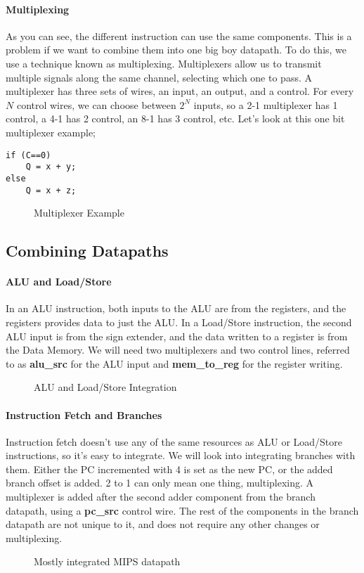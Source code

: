 \paragraph{Multiplexing}
As you can see, the different instruction can use the same components. This is a problem if we want to combine them into one big boy datapath. To do this, we use a technique known as multiplexing. Multiplexers allow us to transmit multiple signals along the same channel, selecting which one to pass. A multiplexer has three sets of wires, an input, an output, and a control. For every $N$ control wires, we can choose between $2^N$ inputs, so a 2-1 multiplexer has 1 control, a 4-1 has 2 control, an 8-1 has 3 control, etc. Let's look at this one bit multiplexer example;
\begin{verbatim}
if (C==0)
    Q = x + y;
else
    Q = x + z;
\end{verbatim}

 \begin{figure}[!htb]
 	\caption{\label{fig:multiplex} Multiplexer Example}
 \end{figure}
\subsection{Combining Datapaths}
\paragraph{ALU and Load/Store}
In an ALU instruction, both inputs to the ALU are from the registers, and the registers provides data to just the ALU. In a Load/Store instruction, the second ALU input is from the sign extender, and the data written to a register is from the Data Memory. We will need two multiplexers and two control lines, referred to as \textbf{alu\_src} for the ALU input and \textbf{mem\_to\_reg} for the register writing.
\begin{figure}[!htb]
	\caption{\label{fig:aluls} ALU and Load/Store Integration}
\end{figure}
\paragraph{Instruction Fetch  and Branches}
Instruction fetch doesn't use any of the same resources as ALU or Load/Store instructions, so it's easy to integrate. We will look into integrating branches with them. Either the PC incremented with 4 is set as the new PC, or the added branch offset is added. 2 to 1 can only mean one thing, multiplexing. A multiplexer is added after the second adder component from the branch datapath, using a \textbf{pc\_src} control wire. The rest of the components in the branch datapath are not unique to it, and does not require any other changes or multiplexing.
 \begin{figure}[!htb]
	\caption{\label{fig:fullint} Mostly integrated MIPS datapath}
\end{figure}

